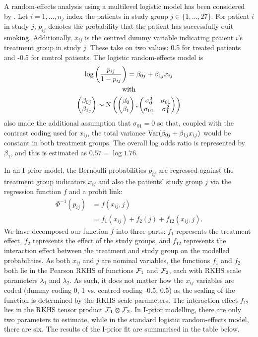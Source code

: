 \documentclass[a4paper,showframe,11pt]{report}\usepackage[]{graphicx}\usepackage[]{color}
\begin{document}
A random-effects analysis using a multilevel logistic model has been considered by \citet{agresti2000tutorial}.
Let $i=1,\dots,n_j$ index the patients in study group $j \in \{1,\dots,27\}$.
For patient $i$ in study $j$, $p_{ij}$ denotes the probability that the patient has successfully quit smoking.
Additionally, $x_{ij}$ is the centred dummy variable indicating patient $i$'s treatment group in study $j$.
These take on two values: 0.5 for treated patients and -0.5 for control patients.
The logistic random-effects model is
\begin{gather*}
  \log \left( \frac{p_{ij}}{1-p_{ij}} \right) = \beta_{0j} + \beta_{1j}x_{ij} \\
  \text{with} \\
  \begin{pmatrix} \beta_{0j} \\ \beta_{1j} \end{pmatrix}
  \sim \operatorname{N} \left(
  \begin{pmatrix} \beta_0 \\ \beta_1 \end{pmatrix},
  \begin{pmatrix} \sigma_0^2 & \sigma_{01} \\ \sigma_{01} & \sigma_1^2 \\ \end{pmatrix}
  \right)
\end{gather*}
\citet{agresti2000tutorial} also made the additional assumption that $\sigma_{01} = 0$ so that, coupled with the contrast coding used for $x_{ij}$, the total variance $\operatorname{Var}(\beta_{0j} + \beta_{1j}x_{ij})$ would be constant in both treatment groups.
The overall log odds ratio is represented by $\beta_1$, and this is estimated as $0.57 = \log 1.76$.

In an I-prior model, the Bernoulli probabilities $p_{ij}$ are regressed against the treatment group indicators $x_{ij}$ and also the patients' study group $j$ via the regression function $f$ and a probit link:
\begin{align*}
  \Phi^{-1}(p_{ij})
  &= f(x_{ij}, j) \\
  &= f_1(x_{ij}) + f_2(j) + f_{12}(x_{ij}, j).
\end{align*}
We have decomposed our function $f$ into three parts: $f_1$ represents the treatment effect, $f_2$ represents the effect of the study groups, and $f_{12}$ represents the interaction effect between the treatment and study group on the modelled probabilities.
As both $x_{ij}$ and $j$ are nominal variables, the functions $f_1$ and $f_2$ both lie in the Pearson RKHS of functions ${\mathcal F}_1$ and ${\mathcal F}_2$, each with RKHS scale parameters $\lambda_1$ and $\lambda_2$.
As such, it does not matter how the $x_{ij}$ variables are coded (dummy coding 0, 1 vs. centred coding -0.5, 0.5) as the scaling of the function is determined by the RKHS scale parameters.
The interaction effect $f_{12}$ lies in the RKHS tensor product ${\mathcal F}_1 \otimes {\mathcal F}_2$.
In I-prior modelling, there are only two parameters to estimate, while in the standard logistic random-effects model, there are six.
The results of the I-prior fit are summarised in the table below.
\end{document}
